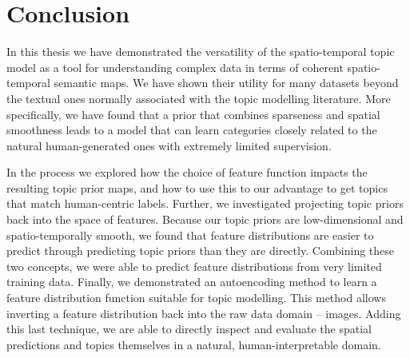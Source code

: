 
\chapter{Conclusion}

In this thesis we have demonstrated the versatility of the spatio-temporal topic model as a tool for understanding complex data in terms of coherent spatio-temporal semantic maps. We have shown their utility for many datasets beyond the textual ones normally associated with the topic modelling literature. More specifically, we have found that a prior that combines sparseness and spatial smoothness leads to a model that can learn categories closely related to the natural human-generated ones with extremely limited supervision.

In the process we explored how the choice of feature function impacts the resulting topic prior maps, and how to use this to our advantage to get topics that match human-centric labels. Further, we investigated projecting topic priors back into the space of features. Because our topic priors are low-dimensional and spatio-temporally smooth, we found that feature distributions are easier to predict through predicting topic priors than they are directly. Combining these two concepts, we were able to predict feature distributions from very limited training data. Finally, we demonstrated an autoencoding method to learn a feature distribution function suitable for topic modelling. This method allows inverting a feature distribution back into the raw data domain -- images. Adding this last technique, we are able to directly inspect and evaluate the spatial predictions and topics themselves in a natural, human-interpretable domain.

